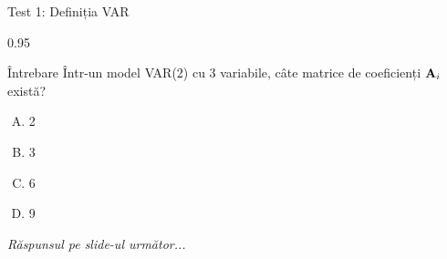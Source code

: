 \documentclass[9pt, aspectratio=169, t]{beamer}
\begin{document}
\begin{frame}{Test 1: Definiția VAR}
    \begin{cminipage}{0.95\textwidth}
    \begin{alertblock}{Întrebare}
        Într-un model VAR(2) cu 3 variabile, câte matrice de coeficienți $\mathbf{A}_i$ există?
    \end{alertblock}

    \vspace{0.3cm}

    \begin{enumerate}[A)]\setlength{\itemsep}{0pt}
        \item 2
        \item 3
        \item 6
        \item 9
    \end{enumerate}

    \vspace{0.5cm}
    \begin{flushright}\textit{Răspunsul pe slide-ul următor...}\end{flushright}
    \end{cminipage}
\end{frame}
\end{document}
